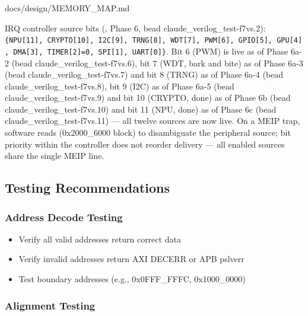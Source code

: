 \begin{relocated}{docs/design/MEMORY_MAP.md}
{}

IRQ controller source bits (, Phase 6, bead
claude\_\allowbreak{}verilog\_\allowbreak{}test-f7vs.2):
\texttt{\{NPU[11],\allowbreak{}\ CRYPTO[10],\allowbreak{}\ I2C[9],\allowbreak{}\ TRNG[8],\allowbreak{}\ WDT[7],\allowbreak{}\ PWM[6],\allowbreak{}\ GPIO[5],\allowbreak{}\ GPU[4],\allowbreak{}\ DMA[3],\allowbreak{}\ TIMER[2]=\allowbreak{}0,\allowbreak{}\ SPI[1],\allowbreak{}\ UART[0]\}}.
Bit 6 (PWM) is live as of Phase 6a-2 (bead
claude\_\allowbreak{}verilog\_\allowbreak{}test-f7vs.6), bit 7 (WDT,
bark and bite) as of Phase 6a-3 (bead
claude\_\allowbreak{}verilog\_\allowbreak{}test-f7vs.7) and bit 8 (TRNG)
as of Phase 6a-4 (bead
claude\_\allowbreak{}verilog\_\allowbreak{}test-f7vs.8), bit 9 (I2C) as
of Phase 6a-5 (bead
claude\_\allowbreak{}verilog\_\allowbreak{}test-f7vs.9) and bit 10
(CRYPTO, done) as of Phase 6b (bead
claude\_\allowbreak{}verilog\_\allowbreak{}test-f7vs.10) and bit 11
(NPU, done) as of Phase 6c (bead
claude\_\allowbreak{}verilog\_\allowbreak{}test-f7vs.11) --- all twelve
sources are now live. On a MEIP trap, software reads 
(0x2000\_\allowbreak{}6000 block) to disambiguate the peripheral source;
bit priority within the controller does not reorder delivery --- all
enabled sources share the single MEIP line.

\subsection{Testing Recommendations}\label{ds:mm:memory-map:testing-recommendations}

\subsubsection{Address Decode Testing}\label{ds:mm:memory-map:address-decode-testing}

\begin{itemize}
\tightlist
\item
  Verify all valid addresses return correct data
\item
  Verify invalid addresses return AXI DECERR or APB pslverr
\item
  Test boundary addresses (e.g., 0x0FFF\_\allowbreak{}FFFC,
  0x1000\_\allowbreak{}0000)
\end{itemize}

\subsubsection{Alignment Testing}\label{ds:mm:memory-map:alignment-testing}


\end{relocated}
